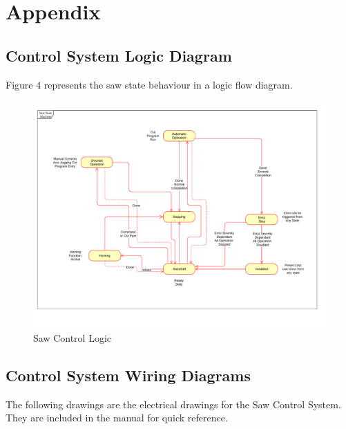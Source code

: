 
\chapter{Appendix}

\section{Control System Logic Diagram}
Figure 4 represents the saw state behaviour in a logic flow diagram.
\begin{figure}
		\centering
		\includegraphics[width=8in,angle=90]{../DRAWINGS/wo19011.pdf}
		\caption{Saw Control Logic}
		\label{fig:Saw-Logic}
\end{figure}
\pagebreak
\section{Control System Wiring Diagrams}
The following drawings are the electrical drawings for the Saw Control System. They are included in the manual for quick reference.
